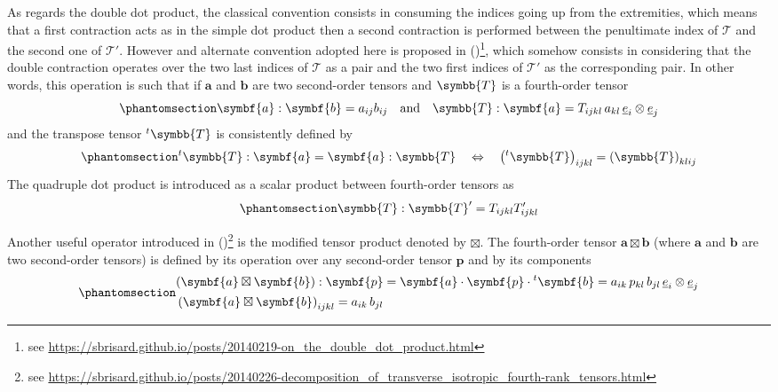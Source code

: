 \documentclass[
  a4paper,
  numbers=noendperiod,
  DIV=12]{scrreprt}
\newcommand{\uu}[1]{{\symbf{{#1}}}}
\newcommand{\uuuu}[1]{{\symbb{{#1}}}}
\newcommand{\uv}[1]{{\underline{{#1}}}}
\newcommand{\ve}[1]{{\uv{{e}}_{{#1}}}}
\newcommand{\trans}[1]{{{}^{t}{#1}}}
\begin{document}
As regards the double dot product, the classical convention consists in
consuming the indices going up from the extremities, which means that a
first contraction acts as in the simple dot product then a second
contraction is performed between the penultimate index of
\(\mathcal{T}\) and the second one of \(\mathcal{T}'\). However and
alternate convention adopted here is proposed in
()\footnote{see
  \url{https://sbrisard.github.io/posts/20140219-on_the_double_dot_product.html}},
which somehow consists in considering that the double contraction
operates over the two last indices of \(\mathcal{T}\) as a pair and the
two first indices of \(\mathcal{T}'\) as the corresponding pair. In
other words, this operation is such that if \(\uu{a}\) and \(\uu{b}\)
are two second-order tensors and \(\uuuu{T}\) is a fourth-order tensor
\begin{equation}\phantomsection\label{eq-doubledot}{
\uu{a}:\uu{b}=a_{ij}b_{ij}
\quad\textrm{and}\quad
\uuuu{T}:\uu{a}=T_{ijkl}\, a_{kl}\, \ve{i}\otimes\ve{j}
}\end{equation} and the transpose tensor \(\trans{\uuuu{T}}\) is
consistently defined by
\begin{equation}\phantomsection\label{eq-trans4}{
\trans{\uuuu{T}}:\uu{a}=\uu{a}:\uuuu{T}
\quad\Leftrightarrow\quad
\left(\trans{\uuuu{T}}\right)_{ijkl}=\left(\uuuu{T}\right)_{klij}
}\end{equation} The quadruple dot product is introduced as a scalar
product between fourth-order tensors as
\begin{equation}\phantomsection\label{eq-dot4}{
\uuuu{T}:\uuuu{T}'=T_{ijkl} T'_{ijkl}
}\end{equation}

Another useful operator introduced in
()\footnote{see
  \url{https://sbrisard.github.io/posts/20140226-decomposition_of_transverse_isotropic_fourth-rank_tensors.html}}
is the modified tensor product denoted by \(\boxtimes\). The
fourth-order tensor \(\uu{a}\boxtimes\uu{b}\) (where \(\uu{a}\) and
\(\uu{b}\) are two second-order tensors) is defined by its operation
over any second-order tensor \(\uu{p}\) and by its components
\begin{equation}\phantomsection\label{eq-boxtimes}{\begin{aligned}
& (\uu{a}\boxtimes\uu{b}):\uu{p}=\uu{a}\cdot\uu{p}\cdot\trans{\uu{b}}
=a_{ik}\,p_{kl}\,b_{jl}\,\ve{i}\otimes\ve{j}
\\
& \left(\uu{a}\boxtimes\uu{b}\right)_{ijkl}=a_{ik}\,b_{jl}
\end{aligned}}\end{equation}
\end{document}
